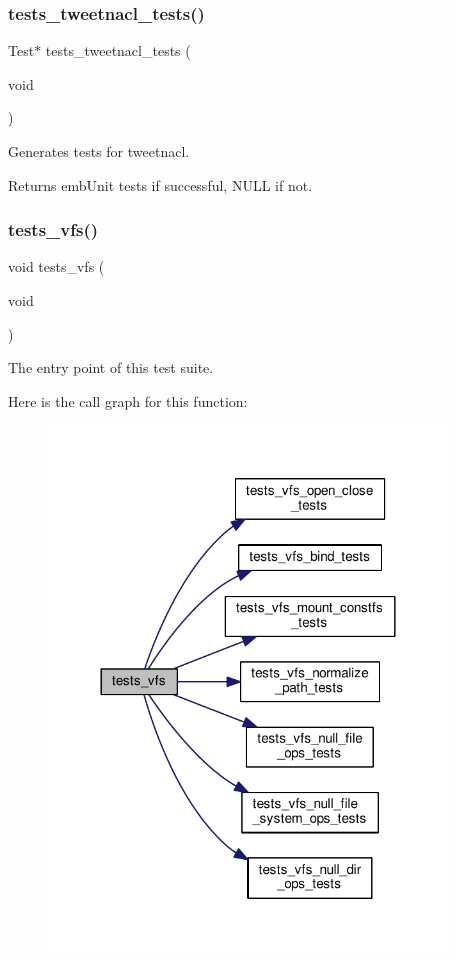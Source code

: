 \subsubsection{\texorpdfstring{tests\+\_\+tweetnacl\+\_\+tests()}{tests\_tweetnacl\_tests()}}
{\footnotesize\ttfamily Test$\ast$ tests\+\_\+tweetnacl\+\_\+tests (\begin{DoxyParamCaption}\item[{void}]{ }\end{DoxyParamCaption})}



Generates tests for tweetnacl. 

\begin{DoxyReturn}{Returns}
emb\+Unit tests if successful, N\+U\+LL if not. 
\end{DoxyReturn}
\mbox{\label{group__unittests_gad7fb89debf7b41f1a3a0d7d988f7654c}} 
\subsubsection{\texorpdfstring{tests\+\_\+vfs()}{tests\_vfs()}}
{\footnotesize\ttfamily void tests\+\_\+vfs (\begin{DoxyParamCaption}\item[{void}]{ }\end{DoxyParamCaption})}



The entry point of this test suite. 

Here is the call graph for this function\+:
\nopagebreak
\begin{figure}[H]
\begin{center}
\leavevmode
\includegraphics[width=300pt]{group__unittests_gad7fb89debf7b41f1a3a0d7d988f7654c_cgraph}
\end{center}
\end{figure}
